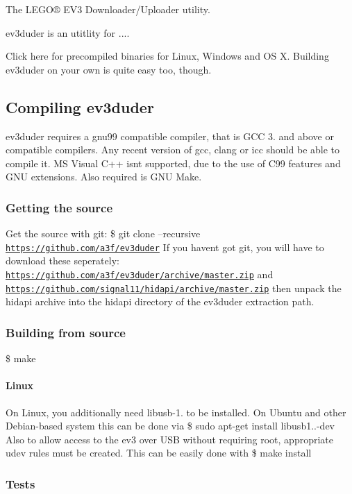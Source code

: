 The L\+E\+G\+O® E\+V3 Downloader/\+Uploader utility.

ev3duder is an utitlity for ....

Click here for precompiled binaries for Linux, Windows and O\+S X. Building ev3duder on your own is quite easy too, though. \subsection*{Compiling ev3duder}

ev3duder requires a gnu99 compatible compiler, that is G\+C\+C 3. and above or compatible compilers. Any recent version of gcc, clang or icc should be able to compile it. M\+S Visual C++ isn\textquotesingle{}t supported, due to the use of C99 features and G\+N\+U extensions. Also required is G\+N\+U Make.

\subsubsection*{Getting the source}

Get the source with git\+: \$ git clone --recursive \href{https://github.com/a3f/ev3duder}{\tt https\+://github.\+com/a3f/ev3duder} If you haven\textquotesingle{}t got git, you will have to download these seperately\+: \href{https://github.com/a3f/ev3duder/archive/master.zip}{\tt https\+://github.\+com/a3f/ev3duder/archive/master.\+zip} and \href{https://github.com/signal11/hidapi/archive/master.zip}{\tt https\+://github.\+com/signal11/hidapi/archive/master.\+zip} then unpack the hidapi archive into the hidapi directory of the ev3duder extraction path.

\subsubsection*{Building from source}

\$ make \paragraph*{Linux}

On Linux, you additionally need libusb-\/1. to be installed. On Ubuntu and other Debian-\/based system this can be done via \$ sudo apt-\/get install libusb1..-\/dev Also to allow access to the ev3 over U\+S\+B without requiring root, appropriate udev rules must be created. This can be easily done with \$ make install \subsubsection*{Tests}

